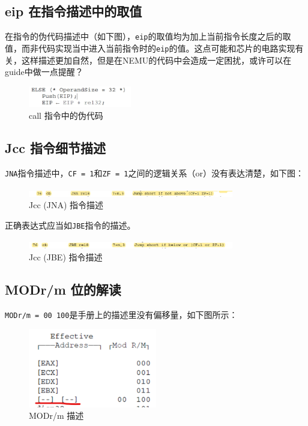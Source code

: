 \documentclass[UTF8]{ctexart}
\begin{document}
\subsection{eip 在指令描述中的取值}
在指令的伪代码描述中（如下图），\verb|eip|的取值均为加上当前指令长度之后的取值，而非代码实现当中进入当前指令时的\verb|eip|的值。这点可能和芯片的电路实现有关，这样描述更加自然，但是在NEMU的代码中会造成一定困扰，或许可以在guide中做一点提醒？

\begin{figure}[H]
    \centering
    \includegraphics[width=0.4\textwidth]{1.jpg}
    \caption{call 指令中的伪代码}
\end{figure}


\subsection{Jcc 指令细节描述}
\verb|JNA|指令描述中，\verb|CF = 1|和\verb|ZF = 1|之间的逻辑关系（or）没有表达清楚，如下图：
\begin{figure}[H]
    \centering
    \includegraphics[width=0.8\textwidth]{2.jpg}
    \caption{Jcc (JNA) 指令描述}
\end{figure}

正确表达式应当如\verb|JBE|指令的描述。
\begin{figure}[H]
    \centering
    \includegraphics[width=0.8\textwidth]{3.jpg}
    \caption{Jcc (JBE) 指令描述}
\end{figure}

\subsection{MODr/m 位的解读}
\verb|MODr/m = 00 100|是手册上的描述里没有偏移量，如下图所示：
\begin{figure}[H]
    \centering
    \includegraphics[width=0.5\textwidth]{4.png}
    \caption{MODr/m 描述}
\end{figure}
\end{document}
